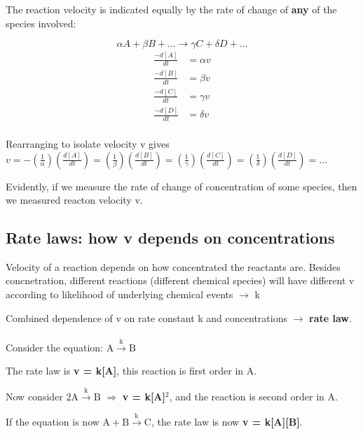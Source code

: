 \documentclass[12pt, letterpaper]{article}
\begin{document}
    The reaction velocity is indicated equally by the rate of change of \textbf{any} of the species involved:

    \begin{equation}
        \alpha A + \beta B + \dots \rightarrow \gamma C + \delta D + \dots
    \end{equation}
    \begin{align*}
        \frac{-d[A]}{dt} &= \alpha v \\
        \frac{-d[B]}{dt} &= \beta v \\
        \frac{-d[C]}{dt} &= \gamma v \\
        \frac{-d[D]}{dt} &= \delta v\\
    \end{align*}

    Rearranging to isolate velocity v gives \\
    
    \(v = - (\frac{1}{\alpha})(\frac{d[A]}{dt}) = (\frac{1}{\beta})(\frac{d[B]}{dt}) = (\frac{1}{\gamma})(\frac{d[C]}{dt}) = (\frac{1}{\delta})(\frac{d[D]}{dt}) = \dots \)
    
    Evidently, if we measure the rate of change of concentration of some species, then we measured reacton velocity v.

    \subsection*{Rate laws: how v depends on concentrations}
    Velocity of a reaction depends on how concentrated the reactants are. Besides concnetration, different reactions 
    (different chemical species) will have different v according to likelihood of underlying chemical events $\rightarrow$ k

    Combined dependence of v on rate constant k and concentrations $\rightarrow$ \textbf{rate law}. \\ \\

    Consider the equation: \(\mathrm{A} \stackrel{\mathrm{k}}{\longrightarrow} \mathrm{B} \)

    The rate law is \textbf{v = k[A]}, this reaction is first order in A. 

    Now consider \( 2\mathrm{A} \stackrel{\mathrm{k}}{\longrightarrow} \mathrm{B} \) $\Rightarrow$ \textbf{v = k[A]$^2$}, and the reaction is second order in A.
    


    If the equation is now \( \mathrm{A}+\mathrm{B} \stackrel{\mathrm{k}}{\longrightarrow} \mathrm{C} \), the rate law is now \textbf{v = k[A][B]}.
\end{document}
